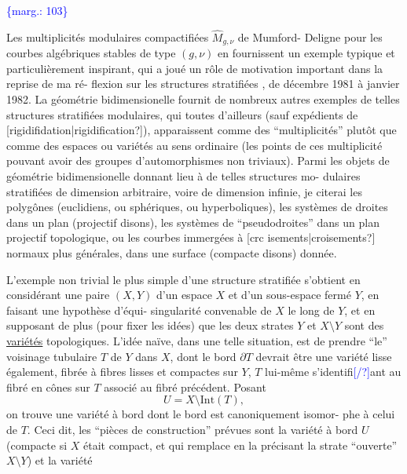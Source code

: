 \documentclass[11pt]{article}
\newcommand{\scanpage}[1]{\par\bigskip\noindent{\small\sffamily[scan #1]}\par}
\newcommand{\mspage}[1]{{\small\sffamily[p.\,#1]}}
\newcommand{\hand}[1]{\textcolor{blue}{#1}}
\newcommand{\margin}[1]{\textcolor{blue}{\{\textsf{marg.:} #1\}}}
\newcommand{\uline}[1]{\underline{#1}}
\newcommand{\unsure}[1]{[#1?]}
\begin{document}
\margin{103}

\clearpage
\scanpage{119/104}
\mspage{26}

Les multiplicités modulaires compactifiées $\hat{M}_{g,\nu}$ de Mumford-%
Deligne pour les courbes algébriques stables de type $(g,\nu)$ en
fournissent un exemple typique et particulièrement inspirant, qui
a joué un rôle de motivation important dans la reprise de ma ré-%
flexion sur les structures stratifiées , de décembre 1981 à janvier
1982. La géométrie bidimensionelle fournit de nombreux autres
exemples de telles structures stratifiées modulaires, qui toutes
d'ailleurs (sauf expédients de \unsure{rigidifidation|rigidification}), apparaissent
comme des ``multiplicités'' plutôt que comme des espaces ou variétés
au sens ordinaire (les points de ces multiplicité pouvant avoir
des groupes d'automorphismes non triviaux). Parmi les objets de
géométrie bidimensionelle donnant lieu à de telles structures mo-%
dulaires stratifiées de dimension arbitraire, voire de dimension
infinie, je citerai les polygônes (euclidiens, ou sphériques, ou
hyperboliques), les systèmes de droites dans un plan (projectif
disons), les systèmes de ``pseudodroites'' dans un plan projectif
topologique, ou les courbes immergées à \unsure{crc isements|croisements} normaux plus
générales, dans une surface (compacte disons) donnée.

L'exemple non trivial le plus simple d'une structure
stratifiée s'obtient en considérant une paire $(X,Y)$ d'un espace
$X$ et d'un sous-espace fermé $Y$, en faisant une hypothèse d'équi-%
singularité convenable de $X$ le long de $Y$, et en supposant de
plus (pour fixer les idées) que les deux strates $Y$ et $X\setminus Y$ sont
des \uline{variétés} topologiques. L'idée naïve, dans une telle situation,
est de prendre ``le'' voisinage tubulaire $T$ de $Y$ dans $X$, dont
le bord $\partial T$ devrait être une variété lisse également, fibrée à
fibres lisses et compactes sur $Y$, $T$ lui-même s'identifi\hand{\unsure{/}}ant au
fibré en cônes sur $T$ associé au fibré précédent. Posant
\[ U = X \setminus \mathrm{Int}(T), \]
on trouve une variété à bord dont le bord est canoniquement isomor-%
phe à celui de $T$. Ceci dit, les ``pièces de construction'' prévues
sont la variété à bord $U$ (compacte si $X$ était compact, et qui
remplace en la précisant la strate ``ouverte'' $X\setminus Y$) et la variété
\end{document}
